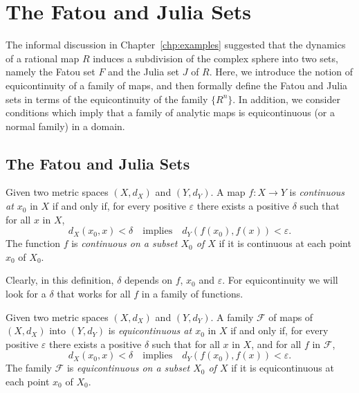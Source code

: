 \chapter{The Fatou and Julia Sets}
\label{chp:the_fatou_and_julia_sets}

The informal discussion in Chapter~\ref{chp:examples} suggested that the
dynamics of a rational map $R$ induces a subdivision of the complex sphere into
two sets, namely the Fatou set $F$ and the Julia set $J$ of $R$. Here, we
introduce the notion of equicontinuity of a family of maps, and then formally
define the Fatou and Julia sets in terms of the equicontinuity of the family
$\{R^n\}$. In addition, we consider conditions which imply that a family of
analytic maps is equicontinuous (or a normal family) in a domain.

\section{The Fatou and Julia Sets}
\label{sec:the_fatou_and_julia_sets}

\begin{definition}
    Given two metric spaces $(X, d_X)$ and $(Y, d_Y)$. A map $f: X \to Y$ is
    \emph{continuous at $x_0$} in $X$ if and only if, for every positive
    $\varepsilon$ there exists a positive $\delta$ such that for all $x$ in $X$,
    \begin{equation*}
        d_X(x_0, x) < \delta \quad \text{implies} \quad d_Y(f(x_0), f(x)) < \varepsilon.
    \end{equation*}
    The function $f$ is \emph{continuous on a subset $X_0$ of $X$} if it is
    continuous at each point $x_0$ of $X_0$.
\end{definition}

Clearly, in this definition, $\delta$ depends on $f$, $x_0$ and $\varepsilon$.
For equicontinuity we will look for a $\delta$ that works for all $f$ in a
family of functions.

\begin{definition}
    Given two metric spaces $(X, d_X)$ and $(Y, d_Y)$. A family $\mathcal{F}$ of
    maps of $(X, d_X)$ into $(Y, d_Y)$ is \emph{equicontinuous at $x_0$} in $X$
    if and only if, for every positive $\varepsilon$ there exists a positive
    $\delta$ such that for all $x$ in $X$, and for all $f$ in $\mathcal{F}$,
    \begin{equation*}
        d_X(x_0, x) < \delta \quad \text{implies} \quad d_Y(f(x_0), f(x)) < \varepsilon.
    \end{equation*}
    The family $\mathcal{F}$ is \emph{equicontinuous on a subset $X_0$ of $X$}
    if it is equicontinuous at each point $x_0$ of $X_0$.
\end{definition}

